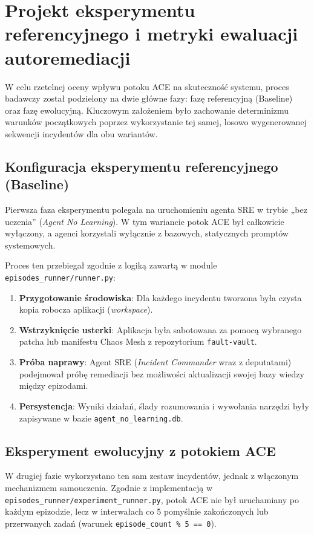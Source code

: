 \chapter{Projekt eksperymentu referencyjnego i metryki ewaluacji autoremediacji}

W celu rzetelnej oceny wpływu potoku ACE na skuteczność systemu, proces badawczy został podzielony na dwie główne fazy: fazę referencyjną (Baseline) oraz fazę ewolucyjną. Kluczowym założeniem było zachowanie determinizmu warunków początkowych poprzez wykorzystanie tej samej, losowo wygenerowanej sekwencji incydentów dla obu wariantów.

\section{Konfiguracja eksperymentu referencyjnego (Baseline)}

Pierwsza faza eksperymentu polegała na uruchomieniu agenta SRE w trybie „bez uczenia” (\textit{Agent No Learning}). W tym wariancie potok ACE był całkowicie wyłączony, a agenci korzystali wyłącznie z bazowych, statycznych promptów systemowych. 

Proces ten przebiegał zgodnie z logiką zawartą w module \texttt{episodes\_runner/runner.py}:
\begin{enumerate}
    \item \textbf{Przygotowanie środowiska}: Dla każdego incydentu tworzona była czysta kopia robocza aplikacji (\textit{workspace}).
    \item \textbf{Wstrzyknięcie usterki}: Aplikacja była sabotowana za pomocą wybranego patcha lub manifestu Chaos Mesh z repozytorium \texttt{fault-vault}.
    \item \textbf{Próba naprawy}: Agent SRE (\textit{Incident Commander} wraz z deputatami) podejmował próbę remediacji bez możliwości aktualizacji swojej bazy wiedzy między epizodami.
    \item \textbf{Persystencja}: Wyniki działań, ślady rozumowania i wywołania narzędzi były zapisywane w bazie \texttt{agent\_no\_learning.db}.
\end{enumerate}

\section{Eksperyment ewolucyjny z potokiem ACE}

W drugiej fazie wykorzystano ten sam zestaw incydentów, jednak z włączonym mechanizmem samouczenia. Zgodnie z implementacją w \texttt{episodes\_runner/experiment\_runner.py}, potok ACE nie był uruchamiany po każdym epizodzie, lecz w interwałach co 5 pomyślnie zakończonych lub przerwanych zadań (warunek \texttt{episode\_count \% 5 == 0}).

